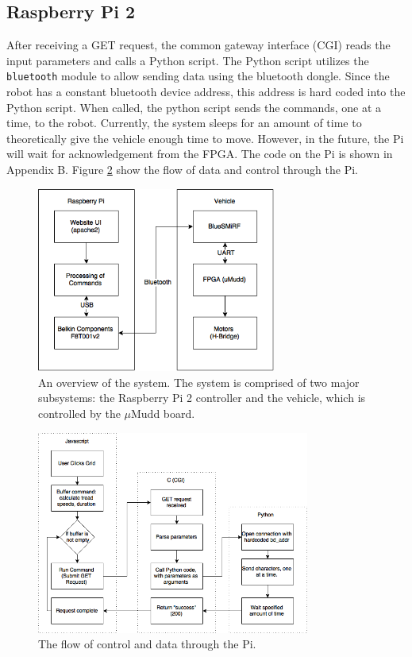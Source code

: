 \documentclass[11pt]{article}
\begin{document}
\subsection{Raspberry Pi 2}

After receiving a GET request, the common gateway interface (CGI) reads the input parameters and calls a Python script. The Python script utilizes the \verb.bluetooth. module to allow sending data using the bluetooth dongle. Since the robot has a constant bluetooth device address, this address is hard coded into the Python script. When called, the python script sends the commands, one at a time, to the robot. Currently, the system sleeps for an amount of time to theoretically give the vehicle enough time to move. However, in the future, the Pi will wait for acknowledgement from the FPGA. The code on the Pi is shown in Appendix B. Figure \ref{fig:piroutines} show the flow of data and control through the Pi.

\begin{figure}
\begin{center}
\includegraphics[width=0.7\textwidth]{E155System}
\end{center}
\caption{An overview of the system. The system is comprised of two major subsystems: the Raspberry Pi 2 controller and the vehicle, which is controlled by the $\mu$Mudd board.}
\label{fig:sys}
\end{figure}

\begin{figure}
\begin{center}
\includegraphics[width=0.8\textwidth]{PiRoutines}
\end{center}
\caption{The flow of control and data through the Pi.}
\label{fig:piroutines}
\end{figure}
\end{document}
